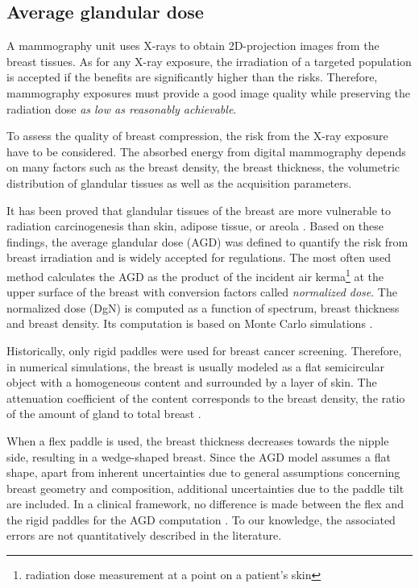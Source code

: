 \subsection{Average glandular dose}
A mammography unit uses X-rays to obtain 2D-projection images from the breast tissues. As for any X-ray exposure, the irradiation of a targeted population is accepted if the benefits are significantly higher than the risks. Therefore,  mammography exposures must provide a good image quality while preserving the radiation dose \textit{as low as reasonably achievable}.

To assess the quality of breast compression, the risk from the X-ray exposure have to be considered.  The absorbed energy from digital mammography depends on many factors such as the breast density, the breast thickness, the volumetric distribution of glandular tissues as well as the acquisition parameters. 

It has been proved that glandular tissues of the breast are more vulnerable to radiation carcinogenesis than skin, adipose tissue, or areola \citep{richard_absorbed_1979}. Based on these findings, the average glandular dose (AGD) was defined to quantify the risk from breast irradiation and is widely accepted for regulations.  The most often used method calculates the AGD as the product of the incident air kerma\footnote{radiation dose measurement at a point on a patient's skin} at the upper surface of the breast with conversion factors called \textit{normalized dose}. The normalized dose (DgN)  is computed as a function of spectrum, breast thickness and breast density.  Its computation is based on Monte Carlo simulations \citep{dance_additional_2000,boone_glandular_1999}. 

Historically, only rigid paddles were used for breast cancer screening. Therefore, in numerical simulations, the breast is usually modeled as a flat semicircular object with a homogeneous content and surrounded by a layer of skin. The attenuation coefficient of the content corresponds to the breast density, the ratio of the amount of gland to total breast \citep{dance_additional_2000}.

 When a flex paddle is used, the breast thickness decreases towards the nipple side, resulting in a wedge-shaped breast.  Since the AGD model assumes a flat shape, apart from inherent uncertainties due to general assumptions concerning breast geometry and composition, additional uncertainties due to the paddle tilt are included. In a clinical framework, no difference is made between the flex and the rigid paddles for the AGD computation \citep{broeders_comparison_2015}. To our knowledge, the associated errors are not quantitatively described in the literature.  

